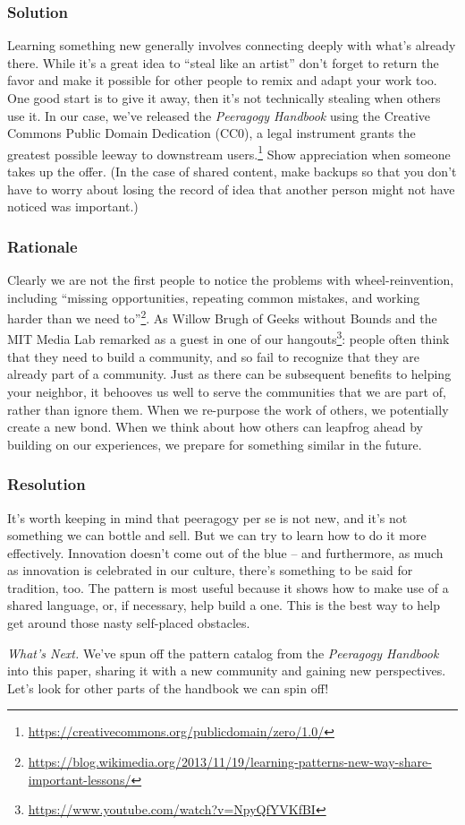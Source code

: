 \subsubsection*{Solution} Learning something new generally involves connecting deeply with what's already there.  While it's a great idea to ``steal like an artist'' don't forget to return the favor and make it possible for other people to remix and adapt your work too.  One good start is to give it away, then it's not technically stealing when others use it.
In our case, we've released the \emph{Peeragogy Handbook} using the Creative Commons Public Domain Dedication (CC0), a legal instrument grants the greatest possible leeway to downstream users.\footnote{\url{https://creativecommons.org/publicdomain/zero/1.0/}}  Show appreciation when someone takes up the offer.  (In the case of shared content, make backups so that you don't have to worry about losing the record of idea that another person might not have noticed was important.)

\subsubsection*{Rationale} 
Clearly we are not the first people to notice the problems with wheel-reinvention, including ``missing opportunities, repeating common mistakes, and working harder than we need to''\footnote{\url{https://blog.wikimedia.org/2013/11/19/learning-patterns-new-way-share-important-lessons/}}.  As Willow Brugh of Geeks without Bounds and the MIT Media Lab remarked as a guest in one of our hangouts\footnote{\url{https://www.youtube.com/watch?v=NpyQfYVKfBI}}: people often think that they need to build a community, and so fail to recognize that they are already part of a community.  Just as there can be subsequent benefits to helping your neighbor, it behooves us well to serve the communities that we are part of, rather than ignore them.   When we re-purpose the work of others, we potentially create a new bond.   When we think about how others can leapfrog ahead by building on our experiences, we prepare for something similar in the future.

\subsubsection*{Resolution}   It's worth keeping in mind that peeragogy per se is not new, and it's not something we can bottle and sell.  But we can try to learn how to do it more effectively.  Innovation doesn't come out of the blue -- and furthermore, as much as innovation is celebrated in our culture, there's something to be said for tradition, too.   The pattern  is most useful because it shows how to make use of a shared language, or, if necessary, help build a one.  This is the best way to help get around those nasty self-placed obstacles.

\begin{framed}
\emph{What's Next.}
We've spun off the pattern catalog from the \emph{Peeragogy Handbook} into this paper, sharing it with a new community and gaining new perspectives.  Let's look for other parts of the handbook we can spin off!
\end{framed}

\endgroup
